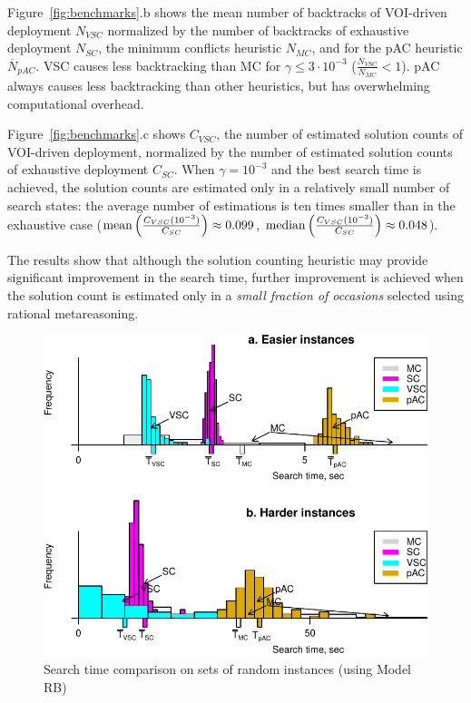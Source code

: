 Figure~\ref{fig:benchmarks}.b shows the mean number of backtracks of
VOI-driven deployment $N_{VSC}$ normalized by the
number of backtracks of exhaustive deployment $N_{SC}$,
the minimum conflicts heuristic $N_{MC}$, and for
the pAC heuristic $\overline N_{pAC}$. VSC causes less backtracking
than MC for $\gamma\le 3\cdot10^{-3}$ ($\frac {N_{VSC}}  {N_{MC}} <
1$). pAC always causes less backtracking than other heuristics, but
has overwhelming computational overhead.

Figure~\ref{fig:benchmarks}.c shows $C_{VSC}$, the number of
estimated solution counts of VOI-driven deployment, normalized by the
number of estimated solution counts of exhaustive deployment
$C_{SC}$. When $\gamma=10^{-3}$ and the best search time is achieved,
the solution counts are estimated  only in a relatively small number
of search states: the average number of estimations is ten times smaller than in the
exhaustive case ($\mathop{\mathrm{mean}}\left(\frac {C_{VSC}(10^{-3})}
{C_{SC}}\right)\approx 0.099$, $\mathop{\mathrm{median}}\left(\frac {C_{VSC}(10^{-3})}
{C_{SC}}\right)\approx 0.048$). 

The results show that although the solution counting heuristic
may provide significant improvement in the search time, further improvement is
achieved when the solution count is estimated only in a \emph{small fraction of
occasions} selected using rational metareasoning.

\begin{figure}[h] 
\centering
\includegraphics[scale=0.67]{csp-random-problems-arrows+legend.pdf}
\caption{Search time comparison on sets of random instances (using
  Model RB)}
\label{fig:random-problems}
\end{figure}

